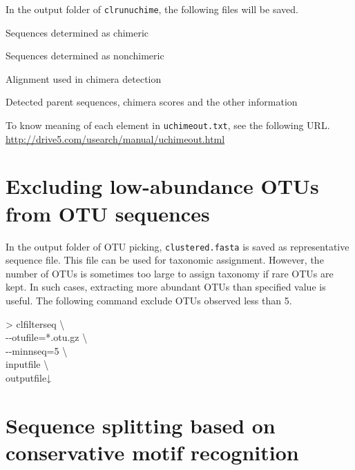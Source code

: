 \documentclass[titlepage,10pt,a4paper,english]{jsbook}
\newenvironment{cmd}{\begin{oframed}\raggedright\ttfamily\footnotesize\setlength{\baselineskip}{1.4em}}{\end{oframed}\vspace{-1em}}
\begin{document}
In the output folder of \texttt{clrunuchime}, the following files will be saved.
\begin{description}\small\setlength{\baselineskip}{1.1em}
\item[chimeras.fasta] Sequences determined as chimeric
\item[nonchimeras.fasta] Sequences determined as nonchimeric
\item[uchimealns.txt] Alignment used in chimera detection
\item[uchimeout.txt] Detected parent sequences, chimera scores and the other information
\end{description}
To know meaning of each element in \texttt{uchimeout.txt}, see the following URL.\\
\href{http://drive5.com/usearch/manual/uchimeout.html}{http://drive5.com/usearch/manual/uchimeout.html}

\section{Excluding low-abundance OTUs from OTU sequences}

In the output folder of OTU picking, \texttt{clustered.fasta} is saved as representative sequence file.
This file can be used for taxonomic assignment.
However, the number of OTUs is sometimes too large to assign taxonomy if rare OTUs are kept.
In such cases, extracting more abundant OTUs than specified value is useful.
The following command exclude OTUs observed less than 5.
\begin{cmd}
{\textgreater} clfilterseq {\textbackslash}\\
{-}{-}otufile=*.otu.gz {\textbackslash}\\
{-}{-}minnseq=5 {\textbackslash}\\
inputfile {\textbackslash}\\
outputfile↓
\end{cmd}

\section{Sequence splitting based on conservative motif recognition}
\end{document}
